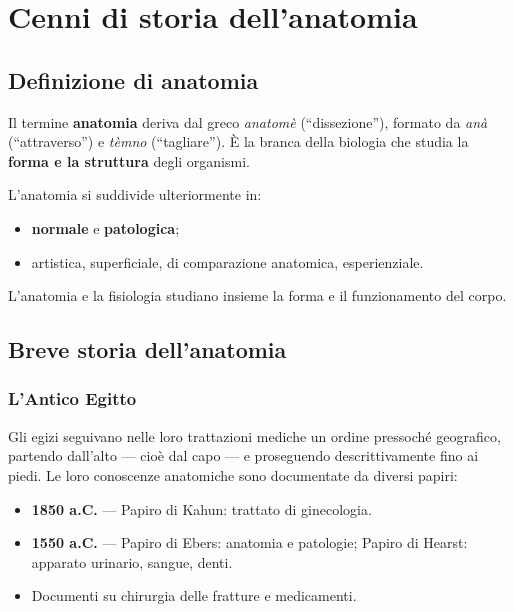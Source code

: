 \chapter{Cenni di storia dell'anatomia}

\section{Definizione di anatomia}

Il termine \textbf{anatomia} deriva dal greco \textit{anatomè} (``dissezione''), formato da \textit{anà} (``attraverso'') e \textit{tèmno} (``tagliare''). È la branca della biologia che studia la \textbf{forma e la struttura} degli organismi.

L'anatomia si suddivide ulteriormente in:
\begin{itemize}
  \item \textbf{normale} e \textbf{patologica};
  \item artistica, superficiale, di comparazione anatomica, esperienziale.
\end{itemize}

L'anatomia e la fisiologia studiano insieme la forma e il funzionamento del corpo.

\section{Breve storia dell'anatomia}

\subsection{L'Antico Egitto}

Gli egizi seguivano nelle loro trattazioni mediche un ordine pressoché geografico, partendo dall'alto --- cioè dal capo --- e proseguendo descrittivamente fino ai piedi. Le loro conoscenze anatomiche sono documentate da diversi papiri:

\begin{itemize}
  \item \textbf{1850 a.C.} --- Papiro di Kahun: trattato di ginecologia.
  \item \textbf{1550 a.C.} --- Papiro di Ebers: anatomia e patologie; Papiro di Hearst: apparato urinario, sangue, denti.
  \item Documenti su chirurgia delle fratture e medicamenti.
\end{itemize}

